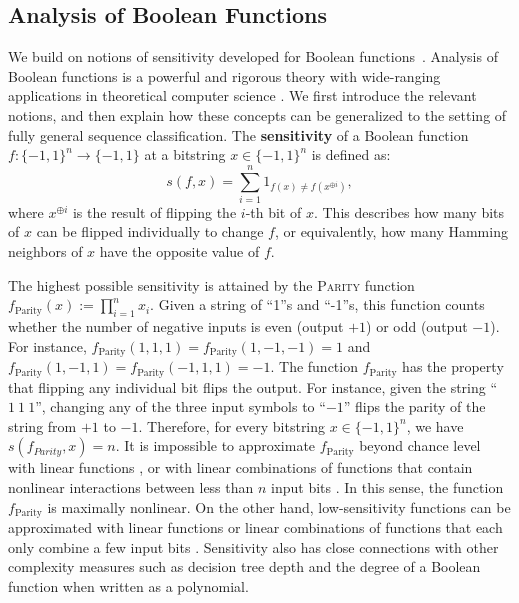 \documentclass[11pt,a4paper]{article}
\begin{document}
\subsection{Analysis of Boolean Functions}
We build on notions of sensitivity developed for Boolean functions~\cite{kahn1988the,hatami2010variations,odonnell2014analysis}.
Analysis of Boolean functions is a powerful and rigorous theory with wide-ranging applications in theoretical computer science \citep{odonnell2014analysis}.
We first introduce the relevant notions, and then explain how these concepts can be generalized to the setting of fully general sequence classification.
%
The \textbf{sensitivity} of a Boolean function $f : \{-1,1\}^n \rightarrow \{-1,1\}$ at a bitstring $x \in \{-1,1\}^n$ is defined as:
\begin{equation}\label{eq:sens-def-boolean}
    s(f,x) = \sum_{i=1}^n 1_{f(x)\neq f(x^{\oplus i})},
\end{equation}
where $x^{\oplus i}$ is the result of flipping the $i$-th bit of $x$.
This describes how many bits of $x$ can be flipped individually to change $f$, or equivalently, how many Hamming neighbors of $x$ have the opposite value of $f$.



The highest possible sensitivity is attained by the  \textsc{Parity} function $f_\text{Parity}(x) := \prod_{i=1}^n x_i$.
Given a string of ``1''s and ``-1''s, this function counts whether the number of negative inputs is even (output $+1$) or odd (output $-1$). For instance, $f_\text{Parity}(1, 1, 1) = f_\text{Parity}(1, -1, -1) = 1$ and $f_\text{Parity}(1, -1, 1) = f_\text{Parity}(-1, 1, 1) = -1$.
The function $f_\text{Parity}$ has the property that flipping any individual bit flips the output.
For instance, given the string ``$1\ 1\ 1$'', changing any of the three input symbols to ``$-1$'' flips the parity of the string from $+1$ to $-1$.
Therefore, for every bitstring $x \in \{-1,1\}^n$, we have $s(f_{Parity}, x) = n$.
It is impossible to approximate $f_\text{Parity}$ beyond chance level with linear functions \citep{minsky1969perceptrons}, or with linear combinations of functions that contain nonlinear interactions between less than $n$ input bits \citep{odonnell2014analysis}.
In this sense, the function $f_\text{Parity}$ is maximally nonlinear.
%
On the other hand, low-sensitivity functions can be approximated with linear functions or linear combinations of functions that each only combine a few input bits \citep[Thm. 2.38]{odonnell2014analysis}.
Sensitivity also has close connections with other complexity measures such as decision tree depth \citep{nisan1991crew} and the degree of a Boolean function when written as a polynomial.
\end{document}
